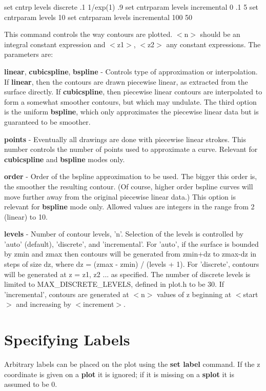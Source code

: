         {set cntrp levels discrete .1 1/exp(1) .9}
        {set cntrparam levels incremental  0 .1 5 }
        {set cntrparam levels 10 }
        {set cntrparam levels incremental 100 50}

This command controls the way contours are plotted. $<$n$>$ should be an
integral constant expression and $<$z1$>$, $<$z2$>$ any constant expressions.
The parameters are:

{\bf linear}, {\bf cubicspline}, {\bf bspline} - Controls type of approximation or
interpolation. If {\bf linear}, then the contours are drawn piecewise
linear, as extracted from the surface directly. If {\bf cubicspline}, then
piecewise linear contours are interpolated to form a somewhat smoother
contours, but which may undulate. The third option is the uniform
{\bf bspline}, which only approximates the piecewise linear data but is
guaranteed to be smoother.

{\bf points} - Eventually all drawings are done with piecewise linear
strokes.  This number controls the number of points used to
approximate a curve.  Relevant for {\bf cubicspline} and {\bf bspline} modes
only.

{\bf order}  - Order of the bspline approximation to be used. The bigger this
order is, the smoother the resulting contour.  (Of course, higher order
bspline curves will move further away from the original piecewise linear
data.)  This option is relevant for {\bf bspline} mode only. Allowed values are
integers in the range from 2 (linear) to 10.

{\bf levels} - Number of contour levels, 'n'.  Selection of the levels is
controlled by 'auto' (default), 'discrete', and 'incremental'. For 'auto',
if the surface is bounded by zmin and zmax then contours will be
generated from zmin+dz to zmax-dz in steps of size dz, where
dz = (zmax - zmin) / (levels + 1).  For 'discrete', contours will be
generated at z = z1, z2 ... as specified.  The number of discrete levels
is limited to MAX\_DISCRETE\_LEVELS, defined in plot.h to be 30.  If
'incremental', contours are generated at $<$n$>$ values of z beginning at
$<$start$>$ and increasing by $<$increment$>$.

\section{Specifying Labels}
Arbitrary labels can be placed on the plot using the {\bf set label}
command.  If the z coordinate is given on a {\bf plot} it is ignored; if
it is missing on a {\bf splot} it is assumed to be 0.

